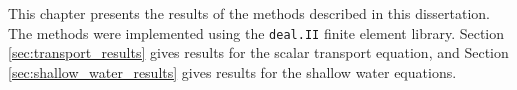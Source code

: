 This chapter presents the results of the methods described in this
dissertation. The methods were implemented using the \texttt{deal.II}
finite element library\cite{dealii}.
Section \ref{sec:transport_results} gives results for the
scalar transport equation, and Section \ref{sec:shallow_water_results}
gives results for the shallow water equations.
